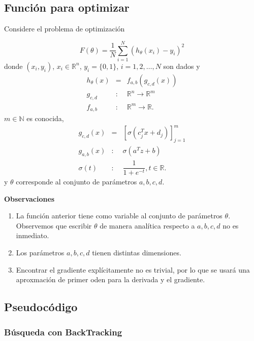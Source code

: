 \documentclass[11pt,letterpaper]{article}
\theoremstyle{definition}
\theoremstyle{definition}
\theoremstyle{definition}
\begin{document}
\subsection{Función para optimizar}
Considere el problema de optimización
\begin{shaded*}
	\begin{equation*}
	F(\theta) = \dfrac{1}{N} \sum_{i = 1}^N (h_\theta (x_i) - y_i)^2
	\end{equation*}
	donde $ (x_i, y_i) $, $ x_i \in \mathbb{R}^n $, $ y_i = \{ 0, 1 \} $, $ i = 1, 2, \dots, N $ son dados y 
	\begin{eqnarray*}
		h_\theta (x) & = & f_{a,b} (g_{c,d} (x)) \\
		g_{c,d}      & : & \mathbb{R}^n \to \mathbb{R}^m \\
		f_{a,b}      & : & \mathbb{R}^m \to \mathbb{R}.
	\end{eqnarray*}
	$ m\in \mathbb{N} $ es conocida, 
	\begin{eqnarray*}
		g_{c,d}  (x) & = & \left[ \sigma (c_j^T x + d_j) \right]_{j = 1}^m \\
		g_{a,b}  (x) & : & \sigma (a^T z + b) \\
		\sigma (t)   & : & \dfrac{1}{1 + e^{-t}}, t \in \mathbb{R}.
	\end{eqnarray*}
y $ \theta $ corresponde al conjunto de parámetros $ a, b, c, d $.
\end{shaded*}
\textbf{Observaciones}
\begin{enumerate}
	\item La función anterior tiene como variable al conjunto de parámetros $ \theta $. Observemos que escribir $ \theta $ de manera analítica respecto a $ a, b,c,d $ no es inmediato.
	\item Los parámetros $ a,b,c,d $ tienen distintas dimensiones.
	\item Encontrar el gradiente explícitamente no es trivial, por lo que se usará una aproxmación de primer oden para la derivada y el gradiente.
\end{enumerate}
\subsection{Pseudocódigo}
\subsubsection{Búsqueda con BackTracking}
\begin{shaded*}
	\begin{algorithmic}[1]
		\EndWhile
	\end{algorithmic}
\end{shaded*}
\end{document}
